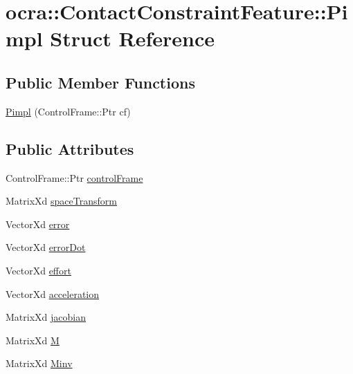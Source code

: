 \hypertarget{structocra_1_1ContactConstraintFeature_1_1Pimpl}{}\section{ocra\+:\+:Contact\+Constraint\+Feature\+:\+:Pimpl Struct Reference}
\label{structocra_1_1ContactConstraintFeature_1_1Pimpl}
\subsection*{Public Member Functions}
\begin{DoxyCompactItemize}
\item 
\hyperlink{structocra_1_1ContactConstraintFeature_1_1Pimpl_a59ec46b69968b06c7e858234acccd990}{Pimpl} (Control\+Frame\+::\+Ptr cf)
\end{DoxyCompactItemize}
\subsection*{Public Attributes}
\begin{DoxyCompactItemize}
\item 
Control\+Frame\+::\+Ptr \hyperlink{structocra_1_1ContactConstraintFeature_1_1Pimpl_a5494b44c1948a8ad255b266b216ab04f}{control\+Frame}
\item 
Matrix\+Xd \hyperlink{structocra_1_1ContactConstraintFeature_1_1Pimpl_a3b33ee6094ed308df598785b4a75416c}{space\+Transform}
\item 
Vector\+Xd \hyperlink{structocra_1_1ContactConstraintFeature_1_1Pimpl_a00ed1a9962ef8b48ed816d4f3f39394b}{error}
\item 
Vector\+Xd \hyperlink{structocra_1_1ContactConstraintFeature_1_1Pimpl_a43821a1f06ddd5af36588e84def45897}{error\+Dot}
\item 
Vector\+Xd \hyperlink{structocra_1_1ContactConstraintFeature_1_1Pimpl_af9482cf46b3e6e4e44c3244b63d899c5}{effort}
\item 
Vector\+Xd \hyperlink{structocra_1_1ContactConstraintFeature_1_1Pimpl_abbd60c31e91c03722e770e7a65890599}{acceleration}
\item 
Matrix\+Xd \hyperlink{structocra_1_1ContactConstraintFeature_1_1Pimpl_ab7a5dfed0b05f6871bad4fcf61d7e998}{jacobian}
\item 
Matrix\+Xd \hyperlink{structocra_1_1ContactConstraintFeature_1_1Pimpl_a2de0104acc90d7ef05e0b5d5c6142ed5}{M}
\item 
Matrix\+Xd \hyperlink{structocra_1_1ContactConstraintFeature_1_1Pimpl_afa7af0eb036037f47dfa1b93c02cd3d5}{Minv}
\end{DoxyCompactItemize}


